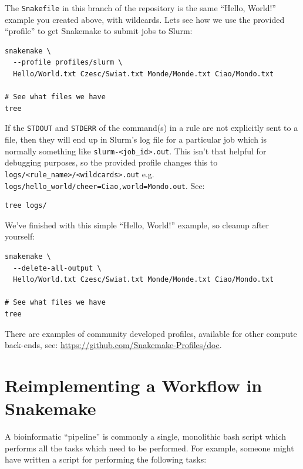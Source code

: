The \texttt{Snakefile} in this branch of the repository is the same ``Hello, World!'' example you created above,
with wildcards. Lets see how we use the provided ``profile'' to get Snakemake to submit jobs to Slurm:

\begin{lstlisting}
snakemake \
  --profile profiles/slurm \
  Hello/World.txt Czesc/Swiat.txt Monde/Monde.txt Ciao/Mondo.txt

# See what files we have
tree
\end{lstlisting}

If the \texttt{STDOUT} and \texttt{STDERR} of the command(s) in a rule are not explicitly sent to a file, then they will
end up in Slurm's log file for a particular job which is normally something like \texttt{slurm-<job\_id>.out}. This isn't
that helpful for debugging purposes, so the provided profile changes this to \texttt{logs/<rule\_name>/<wildcards>.out}
e.g. \texttt{logs/hello\_world/cheer=Ciao,world=Mondo.out}. See:

\begin{lstlisting}
tree logs/
\end{lstlisting}

We've finished with this simple ``Hello, World!'' example, so cleanup after yourself:

\begin{lstlisting}
snakemake \
  --delete-all-output \
  Hello/World.txt Czesc/Swiat.txt Monde/Monde.txt Ciao/Mondo.txt

# See what files we have
tree
\end{lstlisting}

\begin{warning}

There are examples of community developed profiles, available for other compute back-ends, see: \url{https://github.com/Snakemake-Profiles/doc}.

\end{warning}

\section{Reimplementing a Workflow in Snakemake}

A bioinformatic ``pipeline'' is commonly a single, monolithic bash script which performs all the tasks which need
to be performed. For example, someone might have written a script for performing the following tasks:

